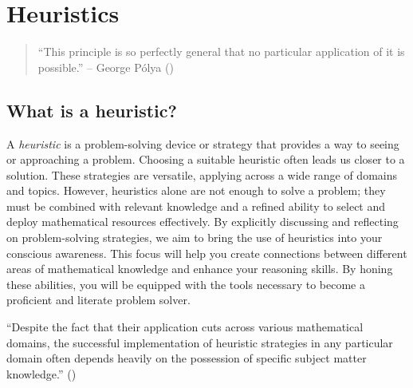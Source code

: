 \documentclass[
  a4paper,
  DIV=11,
  numbers=noendperiod,
  oneside]{scrreprt}
\begin{document}
\chapter{Heuristics}\label{sec-heuristics}

\begin{quote}
``This principle is so perfectly general that no particular application
of it is possible.'' -- George Pólya
()
\end{quote}

\section{What is a heuristic?}\label{what-is-a-heuristic}

A \emph{heuristic} is a problem-solving device or strategy that provides
a way to seeing or approaching a problem. Choosing a suitable heuristic
often leads us closer to a solution. These strategies are versatile,
applying across a wide range of domains and topics. However, heuristics
alone are not enough to solve a problem; they must be combined with
relevant knowledge and a refined ability to select and deploy
mathematical resources effectively. By explicitly discussing and
reflecting on problem-solving strategies, we aim to bring the use of
heuristics into your conscious awareness. This focus will help you
create connections between different areas of mathematical knowledge and
enhance your reasoning skills. By honing these abilities, you will be
equipped with the tools necessary to become a proficient and literate
problem solver.

\begin{tcolorbox}[enhanced jigsaw, toprule=.15mm, leftrule=.75mm, bottomrule=.15mm, opacitybacktitle=0.6, toptitle=1mm, left=2mm, arc=.35mm, rightrule=.15mm, titlerule=0mm, title=\textcolor{quarto-callout-warning-color}{\faExclamationTriangle}\hspace{0.5em}{Heuristics will not replace shaky mastery of a subject!}, coltitle=black, colback=white, colframe=quarto-callout-warning-color-frame, colbacktitle=quarto-callout-warning-color!10!white, breakable, bottomtitle=1mm, opacityback=0]

``Despite the fact that their application cuts across various
mathematical domains, the successful implementation of heuristic
strategies in any particular domain often depends heavily on the
possession of specific subject matter knowledge.''
()

\end{tcolorbox}
\end{document}
